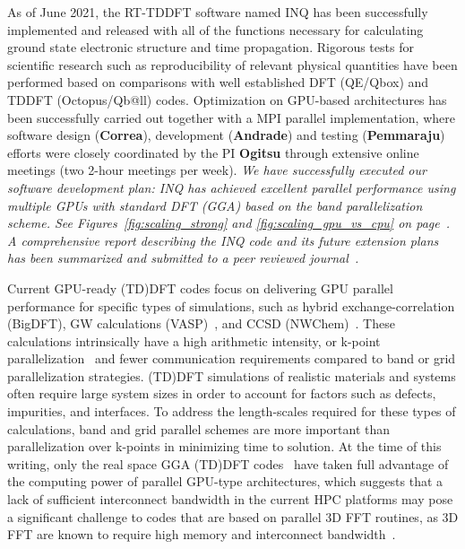 As of June 2021, the RT-TDDFT software named INQ has been successfully implemented and released with all of the functions necessary for calculating ground state electronic structure and time propagation. Rigorous tests for scientific research such as reproducibility of relevant physical quantities have been performed based on comparisons with well established DFT (QE/Qbox) and TDDFT (Octopus/Qb@ll) codes. Optimization on GPU-based architectures has been successfully carried out together with a MPI parallel implementation, where software design ({\bf Correa}), development ({\bf Andrade}) and testing ({\bf Pemmaraju}) efforts were closely coordinated by the PI {\bf Ogitsu} through extensive online meetings (two 2-hour meetings per week). \emph{ We have successfully executed our software development plan: INQ has achieved excellent parallel performance using multiple GPUs with standard DFT (GGA) based on the band parallelization scheme. See Figures~\ref{fig:scaling_strong} and \ref{fig:scaling_gpu_vs_cpu} on page~\pageref{fig:scaling_strong}. A comprehensive report describing the INQ code and its future extension plans has been summarized and submitted to a peer reviewed journal~\cite{andrade2021inq}.} 

Current GPU-ready (TD)DFT codes focus on delivering GPU parallel performance for specific types of simulations, such as hybrid exchange-correlation (BigDFT)\cite{BigDFT2018},  GW calculations (VASP)~\cite{vasp2012,vasp2012b,vasp2018,vasp2019}, and CCSD (NWChem)~\cite{NWChem2013}. These calculations intrinsically have a high arithmetic intensity, or k-point parallelization~\cite{QE2017,QE2020} and fewer communication requirements compared to band or grid parallelization strategies. (TD)DFT simulations of realistic materials and systems often require large system sizes in order to account for factors such as defects, impurities, and interfaces. To address the length-scales required for these types of calculations, band and grid parallel schemes are more important than parallelization over k-points in minimizing time to solution. At the time of this writing, only the real space GGA (TD)DFT codes~\cite{andrade2012time,andrade2013real,SparcX2021} have taken full advantage of the computing power of parallel GPU-type architectures, which suggests that a lack of sufficient interconnect bandwidth in the current HPC platforms may pose a significant challenge to codes that are based on parallel 3D FFT routines, as 3D FFT are known to require high memory and interconnect bandwidth~\cite{heFFTe2020}. 

